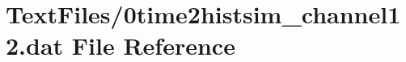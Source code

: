 \hypertarget{0time2histsim__channel12_8dat}{}\section{Text\+Files/0time2histsim\+\_\+channel12.dat File Reference}
\label{0time2histsim__channel12_8dat}
